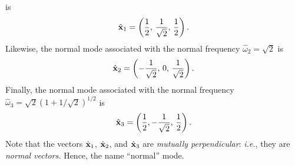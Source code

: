 {is 
\begin{equation}
\hat{\bf x}_1 = \left(\frac{1}{2},\,\frac{1}{\sqrt{2}},\,\frac{1}{2}\right).
\end{equation}
Likewise, the normal mode  associated with the  normal frequency $\hat{\omega}_2=\sqrt{2}$
is 
\begin{equation}
\hat{\bf x}_2 = \left(-\frac{1}{\sqrt{2}},\,0,\,\frac{1}{\sqrt{2}}\right).
\end{equation}
Finally, the 
normal mode  associated with the  normal frequency $\hat{\omega}_3=\sqrt{2}(1+1/\sqrt{2})^{1/2}$
is 
\begin{equation}
\hat{\bf x}_3 =\left(\frac{1}{2},-\frac{1}{\sqrt{2}},\,\frac{1}{2}\right). 
\end{equation}
Note that the vectors $\hat{\bf x}_1$, $\hat{\bf x}_2$, and $\hat{\bf x}_3$ are {\em mutually perpendicular}: {\em i.e.},
they are {\em normal vectors.} Hence, the name ``normal'' mode. 


}
